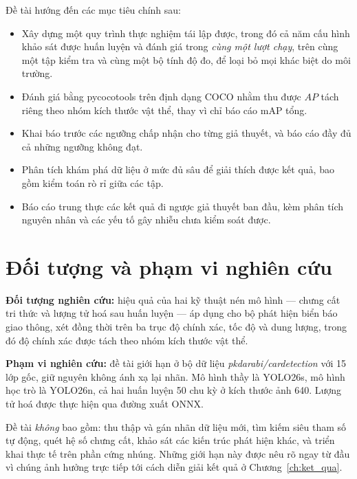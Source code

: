 Đề tài hướng đến các mục tiêu chính sau:

\begin{itemize}[leftmargin=1.5cm]
\item Xây dựng một quy trình thực nghiệm tái lập được, trong đó cả năm cấu hình khảo sát được huấn
luyện và đánh giá trong \emph{cùng một lượt chạy}, trên cùng một tập kiểm tra và cùng một bộ tính
độ đo, để loại bỏ mọi khác biệt do môi trường.

\item Đánh giá bằng pycocotools trên định dạng COCO nhằm thu được $AP$ tách riêng theo nhóm kích
thước vật thể, thay vì chỉ báo cáo mAP tổng.

\item Khai báo trước các ngưỡng chấp nhận cho từng giả thuyết, và báo cáo đầy đủ cả những ngưỡng
không đạt.

\item Phân tích khám phá dữ liệu ở mức đủ sâu để giải thích được kết quả, bao gồm kiểm toán rò rỉ
giữa các tập.

\item Báo cáo trung thực các kết quả đi ngược giả thuyết ban đầu, kèm phân tích nguyên nhân và các
yếu tố gây nhiễu chưa kiểm soát được.
\end{itemize}

\section{Đối tượng và phạm vi nghiên cứu}

\textbf{Đối tượng nghiên cứu:} hiệu quả của hai kỹ thuật nén mô hình --- chưng cất tri thức và
lượng tử hoá sau huấn luyện --- áp dụng cho bộ phát hiện biển báo giao thông, xét đồng thời trên
ba trục độ chính xác, tốc độ và dung lượng, trong đó độ chính xác được tách theo nhóm kích thước
vật thể.

\textbf{Phạm vi nghiên cứu:} đề tài giới hạn ở bộ dữ liệu \textit{pkdarabi/cardetection} với 15 lớp
gốc, giữ nguyên không ánh xạ lại nhãn. Mô hình thầy là YOLO26s, mô hình học trò là YOLO26n, cả hai
huấn luyện 50 chu kỳ ở kích thước ảnh 640. Lượng tử hoá được thực hiện qua đường xuất ONNX.

Đề tài \emph{không} bao gồm: thu thập và gán nhãn dữ liệu mới, tìm kiếm siêu tham số tự động, quét
hệ số chưng cất, khảo sát các kiến trúc phát hiện khác, và triển khai thực tế trên phần cứng nhúng.
Những giới hạn này được nêu rõ ngay từ đầu vì chúng ảnh hưởng trực tiếp tới cách diễn giải kết quả
ở Chương~\ref{ch:ket_qua}.

